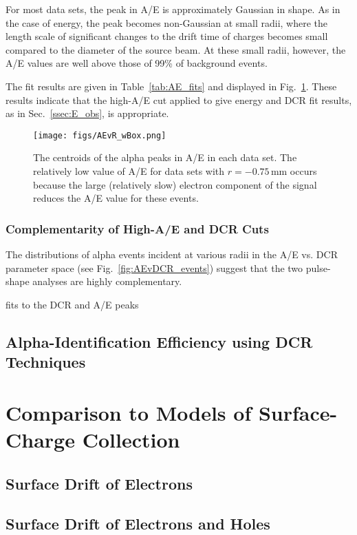 \documentclass[groupedaddress,rmp,amsmath,amssymb,bibnotes,altaffilletter,twocolumn]{revtex4-1}
\begin{document}
For most data sets, the peak in A/E is approximately Gaussian in shape. As in the case of energy, the peak becomes non-Gaussian at small radii, where the length scale of significant changes to the drift time of charges becomes small compared to the diameter of the source beam. At these small radii, however, the A/E values are well above those of 99\% of background events. 

The fit results are given in Table~\ref{tab:AE_fits} and displayed in Fig.~\ref{fig:AEfit_mu}. These results indicate that the high-A/E cut applied to give energy and DCR fit results,  as in Sec.~\ref{ssec:E_obs}, is appropriate.

\begin{figure}[]
 \centering
 \texttt{[image: figs/AEvR\_wBox.png]}
 \caption{The centroids of the alpha peaks in A/E in each data set. The relatively low value of A/E for data sets with $r=-0.75$\,mm occurs because the large (relatively slow) electron component of the signal reduces the A/E value for these events.} 
 \label{fig:AEfit_mu}
\end{figure}

\subsubsection{Complementarity of High-A/E and DCR Cuts}
The distributions of alpha events incident at various radii in the A/E vs. DCR parameter space (see Fig.~\ref{fig:AEvDCR_events}) suggest that the two pulse-shape analyses are highly complementary. 

 fits to the DCR and A/E peaks 


\subsection{Alpha-Identification Efficiency using DCR Techniques}


\section{Comparison to Models of Surface-Charge Collection}
\subsection{Surface Drift of Electrons}
\subsection{Surface Drift of Electrons and Holes}
\end{document}
